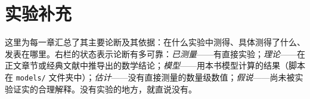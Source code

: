 \chapter{实验补充}
\label{sec:supplement}

这里为每一章汇总了其主要论断及其依据：在什么实验中测得、具体测得了什么、发表在哪里。右栏的状态表示论断有多可靠：\emph{已测量}——有直接实验；\emph{理论}——在正文章节或经典文献中推导出的数学结论；\emph{模型}——用本书模型计算的结果（脚本在 \texttt{models/} 文件夹中）；\emph{估计}——没有直接测量的数量级数值；\emph{假说}——尚未被实验证实的合理解释。没有实验的地方，就直说没有。























